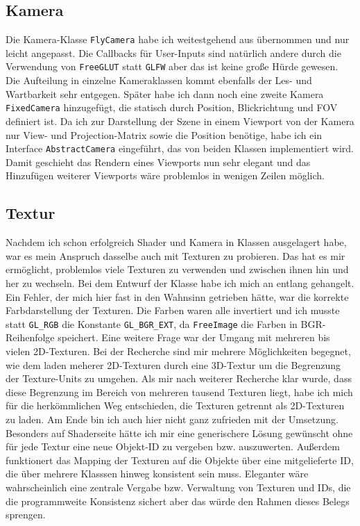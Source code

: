 \documentclass{article}
\let\oldsubsection\subsection
\renewcommand\subsection{\needspace{5\baselineskip}\oldsubsection}
\begin{document}
\subsection{Kamera}
Die Kamera-Klasse \texttt{FlyCamera} habe ich weitestgehend aus \cite{flycam-class} übernommen und nur leicht angepasst.
Die Callbacks für User-Inputs sind natürlich andere durch die Verwendung von \texttt{FreeGLUT} statt \texttt{GLFW} aber das ist keine große Hürde gewesen.
Die Aufteilung in einzelne Kameraklassen kommt ebenfalls der Les- und Wartbarkeit sehr entgegen.
Später habe ich dann noch eine zweite Kamera \texttt{FixedCamera} hinzugefügt, die statisch durch Position, Blickrichtung und FOV definiert ist.
Da ich zur Darstellung der Szene in einem Viewport von der Kamera nur View- und Projection-Matrix sowie die Position benötige, habe ich ein Interface \texttt{AbstractCamera} eingeführt, das von beiden Klassen implementiert wird.
Damit geschieht das Rendern eines Viewports nun sehr elegant und das Hinzufügen weiterer Viewports wäre problemlos in wenigen Zeilen möglich.

\subsection{Textur}
Nachdem ich schon erfolgreich Shader und Kamera in Klassen ausgelagert habe, war es mein Anspruch dasselbe auch mit Texturen zu probieren.
Das hat es mir ermöglicht, problemlos viele Texturen zu verwenden und zwischen ihnen hin und her zu wechseln.
Bei dem Entwurf der Klasse habe ich mich an \cite{texture} entlang gehangelt.
Ein Fehler, der mich hier fast in den Wahnsinn getrieben hätte, war die korrekte Farbdarstellung der Texturen.
Die Farben waren alle invertiert und ich musste statt \texttt{GL\_RGB} die Konstante \texttt{GL\_BGR\_EXT}, da \texttt{FreeImage} die Farben in BGR-Reihenfolge speichert.
Eine weitere Frage war der Umgang mit mehreren bis vielen 2D-Texturen.
Bei der Recherche sind mir mehrere Möglichkeiten begegnet, wie dem laden meherer 2D-Texturen durch eine 3D-Textur um die Begrenzung der Texture-Units zu umgehen.
Als mir nach weiterer Recherche klar wurde, dass diese Begrenzung im Bereich von mehreren tausend Texturen liegt, habe ich mich für die herkömmlichen Weg entschieden, die Texturen getrennt als 2D-Texturen zu laden.
Am Ende bin ich auch hier nicht ganz zufrieden mit der Umsetzung. Besonders auf Shaderseite hätte ich mir eine generischere Lösung gewünscht ohne für jede Textur eine neue Objekt-ID zu vergeben bzw. auszuwerten.
Außerdem funktionert das Mapping der Texturen auf die Objekte über eine mitgelieferte ID, die über mehrere Klasssen hinweg konsistent sein muss.
Eleganter wäre wahrscheinlich eine zentrale Vergabe bzw. Verwaltung von Texturen und IDs, die die programmweite Konsistenz sichert aber das würde den Rahmen dieses Belegs sprengen.
\end{document}
